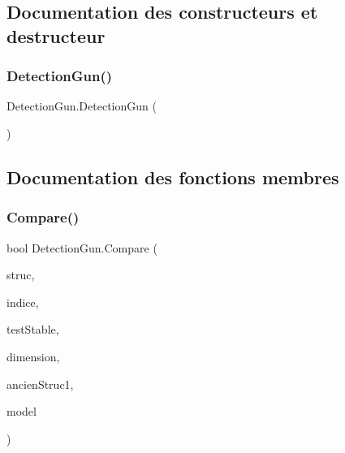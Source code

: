 \subsection{Documentation des constructeurs et destructeur}
\mbox{\label{class_detection_gun_a7fd1d6b8de83ef57d12bf0337833372b}} 
\subsubsection{\texorpdfstring{Detection\+Gun()}{DetectionGun()}}
{\footnotesize\ttfamily Detection\+Gun.\+Detection\+Gun (\begin{DoxyParamCaption}{ }\end{DoxyParamCaption})\hspace{0.3cm}{\ttfamily [inline]}}



\subsection{Documentation des fonctions membres}
\mbox{\label{class_detection_gun_a664491436b7ca39a34f4146754a6ae71}} 
\subsubsection{\texorpdfstring{Compare()}{Compare()}}
{\footnotesize\ttfamily bool Detection\+Gun.\+Compare (\begin{DoxyParamCaption}\item[{List$<$ \mbox{\hyperlink{class_list_vector_gun}{List\+Vector\+Gun}} $>$}]{struc,  }\item[{int}]{indice,  }\item[{bool}]{test\+Stable,  }\item[{int}]{dimension,  }\item[{List$<$ \mbox{\hyperlink{class_list_vector_gun}{List\+Vector\+Gun}} $>$}]{ancien\+Struc1,  }\item[{List$<$ \mbox{\hyperlink{class_list_vector_gun}{List\+Vector\+Gun}} $>$}]{model }\end{DoxyParamCaption})\hspace{0.3cm}{\ttfamily [inline]}}



